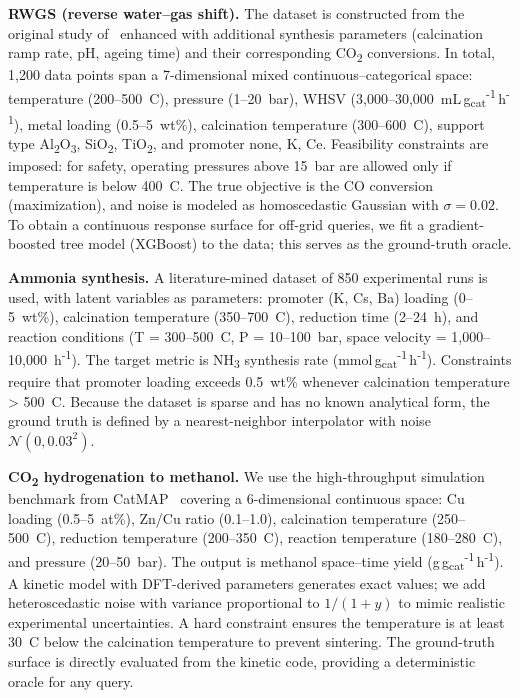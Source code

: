 \documentclass{article}
\begin{document}
\textbf{RWGS (reverse water–gas shift).} The dataset is constructed from the original study of~\cite{...} enhanced with additional synthesis parameters (calcination ramp rate, pH, ageing time) and their corresponding CO\textsubscript{2} conversions. In total, 1,200 data points span a 7-dimensional mixed continuous–categorical space: temperature (200–500~\textdegree C), pressure (1–20~bar), WHSV (3,000–30,000~mL\,g\textsubscript{cat}\textsuperscript{-1}\,h\textsuperscript{-1}), metal loading (0.5–5~wt\%), calcination temperature (300–600~\textdegree C), support type {Al\textsubscript{2}O\textsubscript{3}, SiO\textsubscript{2}, TiO\textsubscript{2}}, and promoter {none, K, Ce}. Feasibility constraints are imposed: for safety, operating pressures above 15~bar are allowed only if temperature is below 400~\textdegree C. The true objective is the CO conversion (maximization), and noise is modeled as homoscedastic Gaussian with \(\sigma = 0.02\). To obtain a continuous response surface for off-grid queries, we fit a gradient-boosted tree model (XGBoost) to the data; this serves as the ground-truth oracle.

\textbf{Ammonia synthesis.} A literature-mined dataset of 850 experimental runs is used, with latent variables as parameters: promoter (K, Cs, Ba) loading (0–5~wt\%), calcination temperature (350–700~\textdegree C), reduction time (2–24~h), and reaction conditions (T = 300–500~\textdegree C, P = 10–100~bar, space velocity = 1,000–10,000~h\textsuperscript{-1}). The target metric is NH\textsubscript{3} synthesis rate (mmol\,g\textsubscript{cat}\textsuperscript{-1}\,h\textsuperscript{-1}). Constraints require that promoter loading exceeds 0.5~wt\% whenever calcination temperature > 500~\textdegree C. Because the dataset is sparse and has no known analytical form, the ground truth is defined by a nearest-neighbor interpolator with noise \(\mathcal{N}(0,0.03^2)\).

\textbf{CO\textsubscript{2} hydrogenation to methanol.} We use the high-throughput simulation benchmark from CatMAP~\cite{...} covering a 6-dimensional continuous space: Cu loading (0.5–5~at\%), Zn/Cu ratio (0.1–1.0), calcination temperature (250–500~\textdegree C), reduction temperature (200–350~\textdegree C), reaction temperature (180–280~\textdegree C), and pressure (20–50~bar). The output is methanol space–time yield (g\,g\textsubscript{cat}\textsuperscript{-1}\,h\textsuperscript{-1}). A kinetic model with DFT-derived parameters generates exact values; we add heteroscedastic noise with variance proportional to \(1/(1+y)\) to mimic realistic experimental uncertainties. A hard constraint ensures the temperature is at least 30~\textdegree C below the calcination temperature to prevent sintering. The ground-truth surface is directly evaluated from the kinetic code, providing a deterministic oracle for any query.
\end{document}
